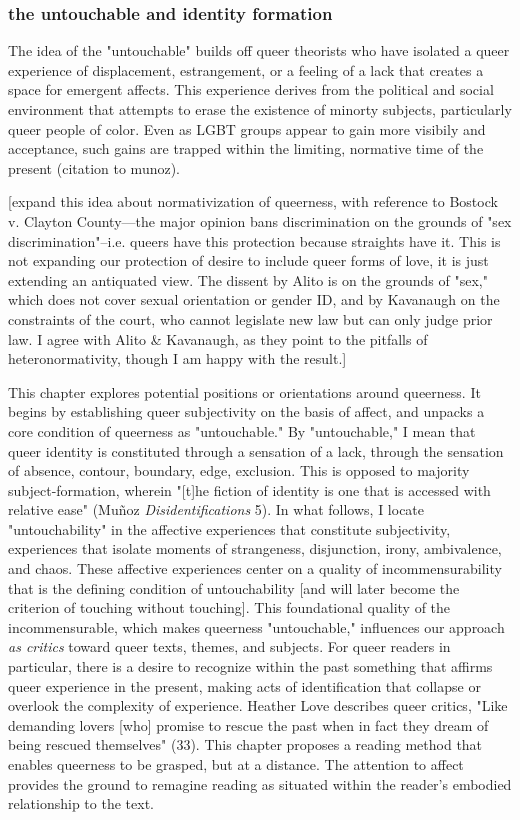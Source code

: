 \documentclass[11pt]{article}
\begin{document}
\subsubsection{the untouchable and identity formation}
\label{sec:orgf5715b5}
The idea of the "untouchable" builds off queer theorists who have
isolated a queer experience of displacement, estrangement, or a
feeling of a lack that creates a space for emergent affects. This
experience derives from the political and social environment that
attempts to erase the existence of minorty subjects, particularly
queer people of color. Even as LGBT groups appear to gain more
visibily and acceptance, such gains are trapped within the limiting,
normative time of the present (citation to munoz). 

[expand this idea about normativization of queerness, with reference
to Bostock v. Clayton County---the major opinion bans discrimination
on the grounds of "sex discrimination"--i.e. queers have this
protection because straights have it. This is not expanding our
protection of desire to include queer forms of love, it is just
extending an antiquated view. The dissent by Alito is on the grounds
of "sex," which does not cover sexual orientation or gender ID, and by
Kavanaugh on the constraints of the court, who cannot legislate new
law but can only judge prior law. I agree with Alito \& Kavanaugh, as
they point to the pitfalls of heteronormativity, though I am happy
with the result.]

This chapter explores potential positions or orientations around
queerness. It begins by establishing queer subjectivity on the basis
of affect, and unpacks a core condition of queerness as "untouchable."
By "untouchable," I mean that queer identity is constituted through a
sensation of a lack, through the sensation of absence, contour,
boundary, edge, exclusion. This is opposed to majority
subject-formation, wherein "[t]he fiction of identity is one that is
accessed with relative ease" (Muñoz \emph{Disidentifications} 5). In what
follows, I locate "untouchability" in the affective experiences that
constitute subjectivity, experiences that isolate moments of
strangeness, disjunction, irony, ambivalence, and chaos. These
affective experiences center on a quality of incommensurability that
is the defining condition of untouchability [and will later become the
criterion of touching without touching]. This foundational quality of
the incommensurable, which makes queerness "untouchable," influences
our approach \emph{as critics} toward queer texts, themes, and
subjects. For queer readers in particular, there is a desire to
recognize within the past something that affirms queer experience in
the present, making acts of identification that collapse or overlook
the complexity of experience. Heather Love describes queer critics,
"Like demanding lovers [who] promise to rescue the past when in fact
they dream of being rescued themselves" (33). This chapter proposes a
reading method that enables queerness to be grasped, but at a
distance. The attention to affect provides the ground to remagine
reading as situated within the reader's embodied relationship to the
text.
\end{document}
